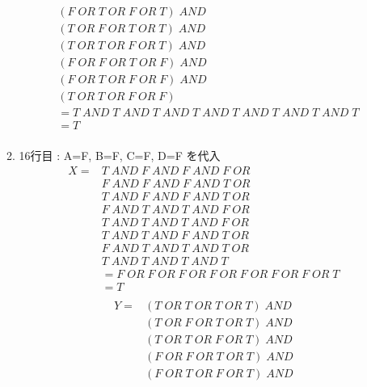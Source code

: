 \documentclass[dvipdfmx,10pt, a4j]{jarticle}
\theoremstyle{definition}
\begin{document}
\begin{enumerate}[i)]
\begin{enumerate}[1)]
\begin{align*}
                & (F\; OR\; T\; OR\; F\; OR\; T)\; AND\\
                & (T\; OR\; F\; OR\; T\; OR\; T)\; AND\\
                & (T\; OR\; T\; OR\; F\; OR\; T)\; AND\\
                & (F\; OR\; F\; OR\; T\; OR\; F)\; AND\\
                & (F\; OR\; T\; OR\; F\; OR\; F)\; AND\\
                & (T\; OR\; T\; OR\; F\; OR\; F)\\
                &= T\; AND\; T\; AND\; T\; AND\; T\; AND\; T\; AND\; T\; AND\; T\; AND\; T\\
                &= T\\
            \end{align*}
            \item 16行目 : A=F, B=F, C=F, D=F を代入\\
            \begin{align*}
                X = &T\; AND\; F\; AND\; F\; AND\; F\; OR\\
                &F\; AND\; F\; AND\; F\; AND\; T\; OR\\
                &T\; AND\; F\; AND\; F\; AND\; T\; OR\\
                &F\; AND\; T\; AND\; T\; AND\; F\; OR\\
                &T\; AND\; T\; AND\; T\; AND\; F\; OR\\
                &T\; AND\; T\; AND\; F\; AND\; T\; OR\\
                &F\; AND\; T\; AND\; T\; AND\; T\; OR\\
                &T\; AND\; T\; AND\; T\; AND\; T\\
                &= F\; OR\; F\; OR\; F\; OR\; F\; OR\; F\; OR\; F\; OR\; F\; OR\; T\\
                &= T\\
            \end{align*}
            \begin{align*}
                Y = & (T\; OR\; T\; OR\; T\; OR\; T) \; AND\\
                & (T\; OR\; F\; OR\; T\; OR\; T)\; AND\\
                & (T\; OR\; T\; OR\; F\; OR\; T)\; AND\\
                & (F\; OR\; F\; OR\; T\; OR\; T)\; AND\\
                & (F\; OR\; T\; OR\; F\; OR\; T)\; AND\\

\end{align*}
\end{enumerate}
\end{enumerate}
\end{document}
